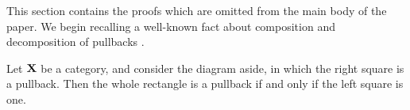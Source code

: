 \documentclass[3p]{elsarticle}
\def\X{\textbf {\textup{X}}}
\theoremstyle{remark}
\theoremstyle{definition}
\begin{document}
This section contains the proofs which are omitted from the main body of the paper. 
%
We begin recalling  a well-known fact about composition and decomposition of pullbacks \cite[Lem.~1.1]{lack2005adhesive}.

\noindent
\begin{minipage}[l]{.75\linewidth}
\begin{lem}\label{lem:pb1}
	Let $\X$ be a category, and consider the diagram aside, in which the right square is a pullback. Then the whole rectangle is a pullback if and only if the left square is one.
\end{lem}
\end{minipage} \hfill
\begin{minipage}[r]{.20\linewidth}
\end{minipage}
	
\end{document}
